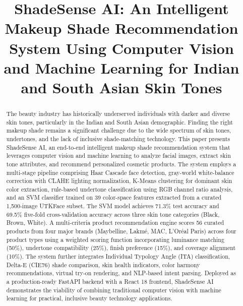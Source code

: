 \documentclass[conference]{IEEEtran}
\begin{document}
\title{ShadeSense AI: An Intelligent Makeup Shade Recommendation System Using Computer Vision and Machine Learning for Indian and South Asian Skin Tones}

\author{
}

\maketitle

\begin{abstract}
The beauty industry has historically underserved individuals with darker and diverse skin tones, particularly in the Indian and South Asian demographic. Finding the right makeup shade remains a significant challenge due to the wide spectrum of skin tones, undertones, and the lack of inclusive shade-matching technology. This paper presents ShadeSense AI, an end-to-end intelligent makeup shade recommendation system that leverages computer vision and machine learning to analyze facial images, extract skin tone attributes, and recommend personalized cosmetic products. The system employs a multi-stage pipeline comprising Haar Cascade face detection, gray-world white-balance correction with CLAHE lighting normalization, K-Means clustering for dominant skin color extraction, rule-based undertone classification using RGB channel ratio analysis, and an SVM classifier trained on 39 color-space features extracted from a curated 1,500-image UTKFace subset. The SVM model achieves 71.3\% test accuracy and 69.5\% five-fold cross-validation accuracy across three skin tone categories (Black, Brown, White). A multi-criteria product recommendation engine scores 56 curated products from four major brands (Maybelline, Lakm\'{e}, MAC, L'Or\'{e}al Paris) across four product types using a weighted scoring function incorporating luminance matching (50\%), undertone compatibility (25\%), finish preference (15\%), and coverage alignment (10\%). The system further integrates Individual Typology Angle (ITA) classification, Delta-E (CIE76) shade comparison, skin health indicators, color harmony recommendations, virtual try-on rendering, and NLP-based intent parsing. Deployed as a production-ready FastAPI backend with a React 18 frontend, ShadeSense AI demonstrates the viability of combining traditional computer vision with machine learning for practical, inclusive beauty technology applications.
\end{abstract}
\end{document}
